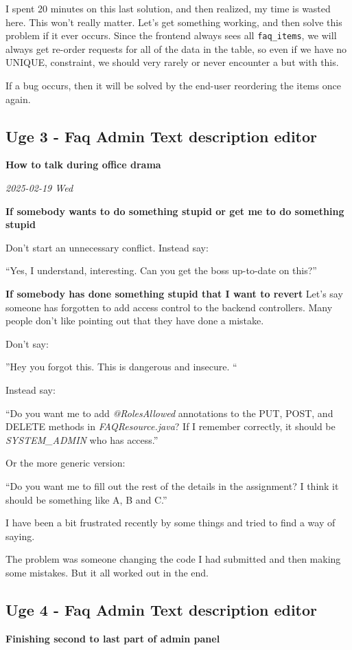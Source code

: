 \documentclass[../main.tex]{subfiles}
\begin{document}
I spent 20 minutes on this last solution, and then realized, my time is wasted here. This won't really matter. Let's get something working, and then solve this problem if it ever occurs. Since the frontend always sees all \verb|faq_items|, we will always get re-order requests for all of the data in the table, so even if we have no UNIQUE, constraint, we should very rarely or never encounter a but with this.

If a bug occurs, then it will be solved by the end-user reordering the items once again.\strut

\subsection{Uge 3 - Faq Admin Text description editor} 

\textbf{How to talk during office drama}

\textit{2025-02-19 Wed}

\textbf{If somebody wants to do something stupid or get me to do
something stupid}

Don't start an unnecessary conflict. Instead say:

``Yes, I understand, interesting. Can you get the boss up-to-date on
this?''

\textbf{If somebody has done something stupid that I want to revert} Let's say someone has forgotten to add access control to the backend controllers. Many people don't like pointing out that they have done a mistake.

Don't say:

''Hey you forgot this. This is dangerous and insecure. ``

Instead say:

``Do you want me to add \emph{@RolesAllowed} annotations to the PUT, POST, and DELETE methods in \emph{FAQResource.java}? If I remember correctly, it should be \emph{SYSTEM\_ADMIN} who has access.''

Or the more generic version:

``Do you want me to fill out the rest of the details in the assignment? I think it should be something like A, B and C.''

I have been a bit frustrated recently by some things and tried to find a way of saying.

The problem was someone changing the code I had submitted and then making some mistakes. But it all worked out in the end. 

\subsection{Uge 4 - Faq Admin Text description editor} \textbf{Finishing second to last part of admin panel}
\end{document}
